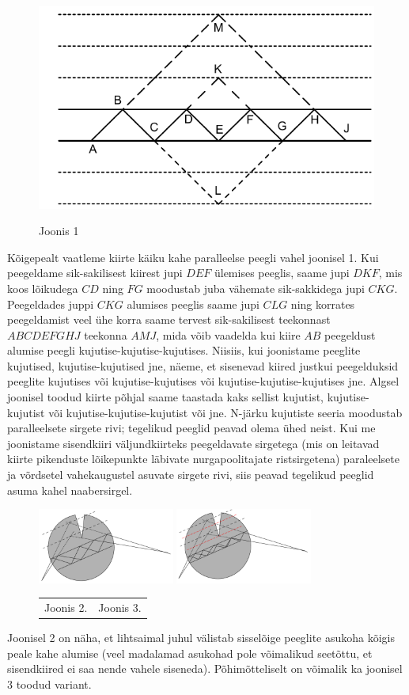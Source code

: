 \solu
\begin{figure}[h]
\centering
\includegraphics[width=0.5\linewidth]{2020-v3g-08-sol1.pdf}\par
Joonis 1
\end{figure}
Kõigepealt vaatleme kiirte käiku kahe paralleelse peegli vahel joonisel 1. Kui peegeldame sik-sakilisest kiirest jupi $DEF$ ülemises peeglis, saame jupi $DKF$, mis koos lõikudega $CD$ ning $FG$ moodustab juba vähemate sik-sakkidega jupi $CKG$. Peegeldades juppi $CKG$  alumises peeglis saame jupi $CLG$ ning korrates peegeldamist veel ühe korra saame tervest sik-sakilisest teekonnast $ABCDEFGHJ$ teekonna $AMJ$, mida võib vaadelda kui kiire $AB$ peegeldust alumise peegli kujutise-kujutise-kujutises. Niisiis, kui joonistame peeglite kujutised, kujutise-kujutised jne, näeme, et sisenevad kiired justkui peegelduksid peeglite kujutises või kujutise-kujutises või kujutise-kujutise-kujutises jne. Algsel joonisel toodud kiirte põhjal saame taastada kaks sellist kujutist, kujutise-kujutist või kujutise-kujutise-kujutist  või jne. N-järku kujutiste seeria moodustab paralleelsete sirgete rivi; tegelikud peeglid peavad olema ühed neist. Kui me joonistame sisendkiiri väljundkiirteks peegeldavate  sirgetega (mis on leitavad kiirte pikenduste lõikepunkte läbivate nurgapoolitajate ristsirgetena) paraleelsete ja võrdsetel vahekaugustel asuvate sirgete rivi, siis peavad tegelikud peeglid asuma kahel naabersirgel.

\begin{figure}[h]
\centering
  \includegraphics[width=0.4\textwidth]{2020-v3g-08-sol2.pdf}
  \includegraphics[width=0.4\textwidth]{2020-v3g-08-sol3.pdf}
  \par
  \begin{tabular}{p{0.5\linewidth}p{0.5\linewidth}}
  \hfil Joonis 2. & \hfil Joonis 3. \\
  \end{tabular}
\end{figure}

Joonisel 2 on näha, et lihtsaimal juhul välistab sisselõige peeglite asukoha kõigis peale kahe alumise (veel madalamad asukohad pole võimalikud seetõttu, et sisendkiired ei saa nende vahele siseneda). Põhimõtteliselt on võimalik ka joonisel 3 toodud variant.
\probend